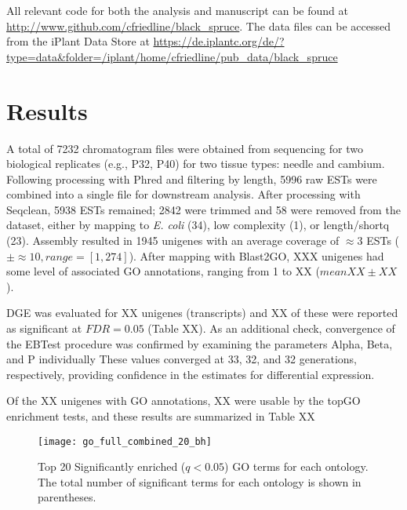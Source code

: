\documentclass[11pt]{article}
\begin{document}
All relevant code for both the analysis and manuscript can be found at
\url{http://www.github.com/cfriedline/black_spruce}.  The data files can 
be accessed from the iPlant Data Store at 
\url{https://de.iplantc.org/de/?type=data&folder=/iplant/home/cfriedline/pub_data/black_spruce}

\section*{Results}

A total of 7232 chromatogram files were obtained from sequencing for
two biological replicates (e.g., P32, P40) for two tissue types:
needle and cambium.  Following processing with Phred and filtering by
length, 5996 raw ESTs were combined into a single file for downstream
analysis.  After processing with Seqclean, 5938 ESTs remained; 2842
were trimmed and 58 were removed from the dataset, either by mapping
to \textit{E. coli} (34), low complexity (1), or length/shortq (23).
Assembly resulted in 1945 unigenes with an average coverage of
$\approx{3}$ ESTs ($\pm \approx{10}, range=[1,274]$). After mapping 
with Blast2GO, XXX unigenes had some level of associated GO annotations, 
ranging from 1 to XX ($mean XX \pm XX$).

DGE was evaluated for XX unigenes (transcripts) and XX of these were
reported as significant at $FDR = 0.05$ (Table XX). As an additional check,
convergence of the EBTest procedure was confirmed by examining the
parameters Alpha, Beta, and P individually These values converged at
33, 32, and 32 generations, respectively, providing confidence in the
estimates for differential expression.

Of the XX unigenes with GO annotations, XX were usable by the 
topGO enrichment tests, and these results are summarized in Table XX




\clearpage

\singlespacing



\clearpage

\begin{figure}[t]
  \centering
  \texttt{[image: go\_full\_combined\_20\_bh]}
  \caption{Top 20 Significantly enriched ($q < 0.05$) GO terms for
    each ontology. The total number of significant terms for each
    ontology is shown in parentheses.}
  \label{fig:go_combined}
\end{figure}
\end{document}
